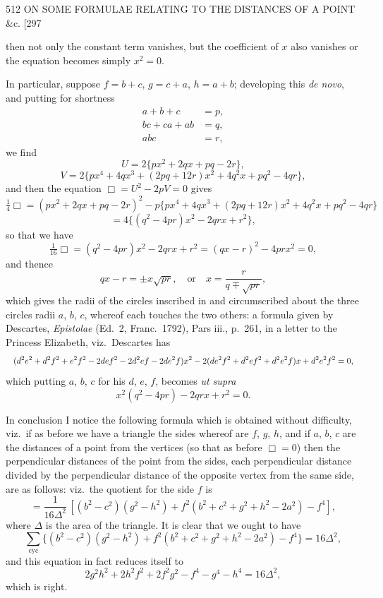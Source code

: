 \documentclass[11pt]{article}
\begin{document}
\newpage
\begin{center}
512 \hfill ON SOME FORMULAE RELATING TO THE DISTANCES OF A POINT \&c. \hfill [297
\end{center}

then not only the constant term vanishes, but the coefficient of $x$ also vanishes or the equation becomes simply $x^{2}=0$.

In particular, suppose $f=b+c$, $g=c+a$, $h=a+b$; developing this \emph{de novo}, and putting for shortness
\[ \begin{aligned}
a+b+c &= p,\\
bc+ca+ab &= q,\\
abc &= r,
\end{aligned} \]
we find
\[ U = 2\{px^{2}+2qx+pq-2r\}, \]
\[ V = 2\{px^{4}+4qx^{3}+(2pq+12r)x^{2}+4q^{2}x+pq^{2}-4qr\}, \]
and then the equation $\Box = U^{2}-2pV = 0$ gives
\[ \tfrac{1}{4}\Box = (px^{2}+2qx+pq-2r)^{2}-p\{px^{4}+4qx^{3}+(2pq+12r)x^{2}+4q^{2}x+pq^{2}-4qr\} \]
\[ = 4\{(q^{2}-4pr)x^{2}-2qrx+r^{2}\}, \]
so that we have
\[ \tfrac{1}{16}\Box = (q^{2}-4pr)x^{2}-2qrx+r^{2} = (qx-r)^{2}-4prx^{2} = 0, \]
and thence
\[ qx-r = \pm x\sqrt{pr},\quad\text{or}\quad x = \frac{r}{q\mp\sqrt{pr}}, \]
which gives the radii of the circles inscribed in and circumscribed about the three circles radii $a$, $b$, $c$, whereof each touches the two others: a formula given by Descartes, \emph{Epistolae} (Ed.\ 2, Franc.\ 1792), Pars iii., p.\ 261, in a letter to the Princess Elizabeth, viz.\ Descartes has
\[ \resizebox{\textwidth}{!}{$\displaystyle
(d^{2}e^{2}+d^{2}f^{2}+e^{2}f^{2}-2def^{2}-2d^{2}ef-2de^{2}f)x^{2}-2(de^{2}f^{2}+d^{2}ef^{2}+d^{2}e^{2}f)x+d^{2}e^{2}f^{2} = 0,
$} \]
which putting $a$, $b$, $c$ for his $d$, $e$, $f$, becomes \emph{ut supra}
\[ x^{2}(q^{2}-4pr)-2qrx+r^{2} = 0. \]

In conclusion I notice the following formula which is obtained without difficulty, viz.\ if as before we have a triangle the sides whereof are $f$, $g$, $h$, and if $a$, $b$, $c$ are the distances of a point from the vertices (so that as before $\Box=0$) then the perpendicular distances of the point from the sides, each perpendicular distance divided by the perpendicular distance of the opposite vertex from the same side, are as follows: viz.\ the quotient for the side $f$ is
\[ = \frac{1}{16\Delta^{2}}\,[(b^{2}-c^{2})(g^{2}-h^{2})+f^{2}(b^{2}+c^{2}+g^{2}+h^{2}-2a^{2})-f^{4}], \]
where $\Delta$ is the area of the triangle. It is clear that we ought to have
\[ \sum_{\mathrm{cyc}}\{(b^{2}-c^{2})(g^{2}-h^{2})+f^{2}(b^{2}+c^{2}+g^{2}+h^{2}-2a^{2})-f^{4}\} = 16\Delta^{2}, \]
and this equation in fact reduces itself to
\[ 2g^{2}h^{2}+2h^{2}f^{2}+2f^{2}g^{2}-f^{4}-g^{4}-h^{4} = 16\Delta^{2}, \]
which is right.
\end{document}
